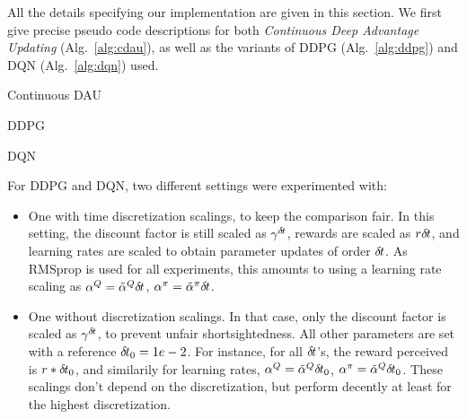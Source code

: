All the details specifying our implementation are given in this section. We
first give precise pseudo code descriptions for both \emph{Continuous Deep
Advantage Updating} (Alg.~\ref{alg:cdau}), as well as the variants of DDPG
(Alg.~\ref{alg:ddpg}) and DQN (Alg.~\ref{alg:dqn}) used.

\begin{algorithm}
	
	\caption{Continuous DAU}
	\label{alg:cdau}
\end{algorithm}
\begin{algorithm}
	
	\caption{DDPG}
	\label{alg:ddpg}
\end{algorithm}
\begin{algorithm}
	
	\caption{DQN}
	\label{alg:dqn}
\end{algorithm}

For DDPG and DQN, two different settings were experimented with:
\begin{itemize}
	\item One with time discretization scalings, to keep the comparison
		fair. In this setting, the discount factor is still scaled as $\gamma^{\delta\hspace{-.1em}t}$,
		rewards are scaled as $r {\delta\hspace{-.1em}t}$, and learning rates are scaled to obtain parameter
		updates of order ${\delta\hspace{-.1em}t}$. As RMSprop is used for all experiments, this amounts
		to using a learning rate scaling as $\alpha^Q = \tilde{\alpha}^Q {\delta\hspace{-.1em}t}$,
		$\alpha^\pi = \tilde{\alpha}^\pi {\delta\hspace{-.1em}t}$.
	\item One without discretization scalings. In that case, only the discount factor is scaled
		as $\gamma^{\delta\hspace{-.1em}t}$, to prevent unfair shortsightedness. All other
		parameters are set with a reference ${\delta\hspace{-.1em}t}_0 = 1e-2$. For instance,
		for all ${\delta\hspace{-.1em}t}$'s, the reward perceived is $r * {\delta\hspace{-.1em}t}_0$, and
		similarily for learning rates, $\alpha^Q = \tilde{\alpha}^Q
		{\delta\hspace{-.1em}t}_0$, $\alpha^\pi = \tilde{\alpha}^Q {\delta\hspace{-.1em}t}_0$. These scalings
		don't depend on the discretization, but perform decently at least for
		the highest discretization.
\end{itemize}
